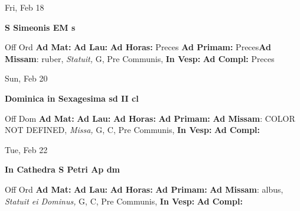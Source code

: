 \documentclass[10pt]{book}
\begin{document}
\begin{center}
\begin{minipage}{3.5in}
\vspace{2em}
\begin{center}Fri, Feb 18
\end{center}
\textbf{ \large S Simeonis EM
\textnormal{\normalsize s}}

\begin{justify}Off Ord
\textbf{Ad Mat: }
\textbf{Ad Lau: }
\textbf{Ad Horas: }Preces
\textbf{Ad Primam: }Preces\textbf{Ad Missam}: ruber, \textit{Statuit,} G, Pre Communis, 
\textbf{In Vesp: }
\textbf{Ad Compl: }Preces
\end{justify}
\end{minipage}
\end{center}

\begin{center}
\begin{minipage}{3.5in}
\vspace{2em}
\begin{center}Sun, Feb 20
\end{center}
\textbf{ \large Dominica in Sexagesima
\textnormal{\normalsize sd II cl}}

\begin{justify}Off Dom
\textbf{Ad Mat: }
\textbf{Ad Lau: }
\textbf{Ad Horas: }
\textbf{Ad Primam: }\textbf{Ad Missam}: COLOR NOT DEFINED, \textit{Missa,} G, C, Pre Communis, 
\textbf{In Vesp: }
\textbf{Ad Compl: }
\end{justify}
\end{minipage}
\end{center}

\begin{center}
\begin{minipage}{3.5in}
\vspace{2em}
\begin{center}Tue, Feb 22
\end{center}
\textbf{ \large In Cathedra S Petri Ap
\textnormal{\normalsize dm}}

\begin{justify}Off Ord
\textbf{Ad Mat: }
\textbf{Ad Lau: }
\textbf{Ad Horas: }
\textbf{Ad Primam: }\textbf{Ad Missam}: albus, \textit{Statuit ei Dominus,} G, C, Pre Communis, 
\textbf{In Vesp: }
\textbf{Ad Compl: }
\end{justify}
\end{minipage}
\end{center}
\end{document}
